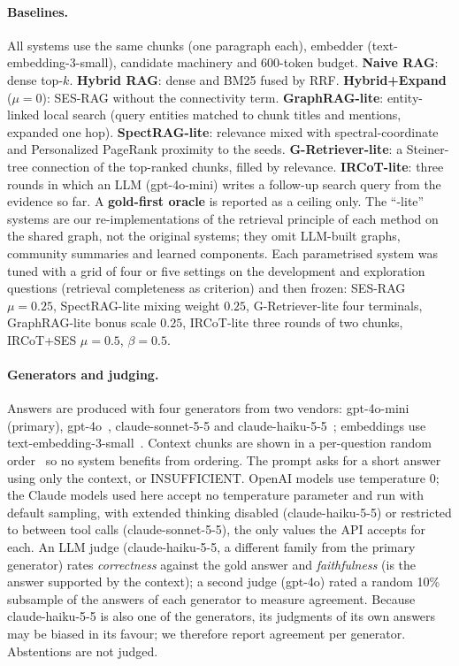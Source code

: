 \paragraph{Baselines.}
All systems use the same chunks (one paragraph each), embedder (text-embedding-3-small), candidate machinery and 600-token budget. \textbf{Naive RAG}: dense top-$k$. \textbf{Hybrid RAG}: dense and BM25 fused by RRF. \textbf{Hybrid+Expand} ($\mu{=}0$): SES-RAG without the connectivity term. \textbf{GraphRAG-lite}: entity-linked local search (query entities matched to chunk titles and mentions, expanded one hop). \textbf{SpectRAG-lite}: relevance mixed with spectral-coordinate and Personalized PageRank proximity to the seeds. \textbf{G-Retriever-lite}: a Steiner-tree connection of the top-ranked chunks, filled by relevance. \textbf{IRCoT-lite}: three rounds in which an LLM (gpt-4o-mini) writes a follow-up search query from the evidence so far. A \textbf{gold-first oracle} is reported as a ceiling only. The ``-lite'' systems are our re-implementations of the retrieval principle of each method on the shared graph, not the original systems; they omit LLM-built graphs, community summaries and learned components. Each parametrised system was tuned with a grid of four or five settings on the development and exploration questions (retrieval completeness as criterion) and then frozen: SES-RAG $\mu{=}0.25$, SpectRAG-lite mixing weight $0.25$, G-Retriever-lite four terminals, GraphRAG-lite bonus scale $0.25$, IRCoT-lite three rounds of two chunks, IRCoT+SES $\mu{=}0.5$, $\beta{=}0.5$.

\paragraph{Generators and judging.}
Answers are produced with four generators from two vendors: gpt-4o-mini (primary), gpt-4o~\cite{hurst2024gpt4o}, claude-sonnet-5-5 and claude-haiku-5-5~\cite{anthropic2026claude}; embeddings use text-embedding-3-small~\cite{openai2024embed}. Context chunks are shown in a per-question random order~\cite{liu2024lost} so no system benefits from ordering. The prompt asks for a short answer using only the context, or INSUFFICIENT. OpenAI models use temperature 0; the Claude models used here accept no temperature parameter and run with default sampling, with extended thinking disabled (claude-haiku-5-5) or restricted to between tool calls (claude-sonnet-5-5), the only values the API accepts for each. An LLM judge (claude-haiku-5-5, a different family from the primary generator) rates \emph{correctness} against the gold answer and \emph{faithfulness} (is the answer supported by the context); a second judge (gpt-4o) rated a random 10\% subsample of the answers of each generator to measure agreement. Because claude-haiku-5-5 is also one of the generators, its judgments of its own answers may be biased in its favour; we therefore report agreement per generator. Abstentions are not judged.

